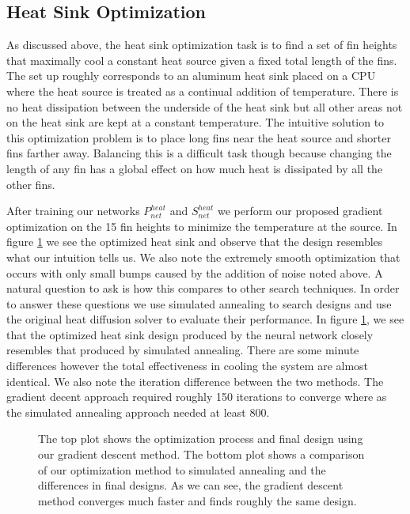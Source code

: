 \documentclass{article} %
\begin{document}
\subsection{Heat Sink Optimization}

As discussed above, the heat sink optimization task is to find a set of fin heights that maximally cool a constant heat source given a fixed total length of the fins. The set up roughly corresponds to an aluminum heat sink placed on a CPU where the heat source is treated as a continual addition of temperature. There is no heat dissipation between the underside of the heat sink but all other areas not on the heat sink are kept at a constant temperature. The intuitive solution to this optimization problem is to place long fins near the heat source and shorter fins farther away. Balancing this is a difficult task though because changing the length of any fin has a global effect on how much heat is dissipated by all the other fins. 

After training our networks $P^{heat}_{net}$ and $S^{heat}_{net}$ we perform our proposed gradient optimization on the 15 fin heights to minimize the temperature at the source. In figure \ref{heat_sink_optimization} we see the optimized heat sink and observe that the design resembles what our intuition tells us. We also note the extremely smooth optimization that occurs with only small bumps caused by the addition of noise noted above. A natural question to ask is how this compares to other search techniques. In order to answer these questions we use simulated annealing to search designs and use the original heat diffusion solver to evaluate their performance. In figure \ref{heat_sink_optimization}, we see that the optimized heat sink design produced by the neural network closely resembles that produced by simulated annealing. There are some minute differences however the total effectiveness in cooling the system are almost identical. We also note the iteration difference between the two methods. The gradient decent approach required roughly 150 iterations to converge where as the simulated annealing approach needed at least 800.

\begin{figure}[h]
\begin{center}
\end{center}
\label{heat_sink_optimization}
\caption{The top plot shows the optimization process and final design using our gradient descent method. The bottom plot shows a comparison of our optimization method to simulated annealing and the differences in final designs. As we can see, the gradient descent method converges much faster and finds roughly the same design. }
\end{figure}
\end{document}
